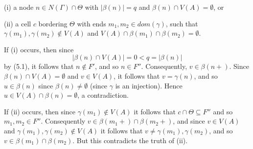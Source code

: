 \hspace*{12pt}(i) a node $n \in N(\Gamma) \cap \Theta$ with $|\beta(n)| = q$ and $\beta(n) \cap V(A) = \emptyset$, or

\hspace*{12pt}(ii) a cell $c$ bordering $\Theta$ with ends $m_1, m_2 \in dom(\gamma)$, such that $\gamma(m_1), \gamma(m_2) \notin V(A)$ and $V(A) \cap \beta(m_1) \cap \beta(m_2) = \emptyset$.

If (i) occurs, then since
\begin{equation*}
|\beta(n) \cap V(A)| = 0 < q = |\beta(n)|
\end{equation*}
by (5.1), it follows that $n \notin F'$, and so $n \in F''$. Consequently, $v \in \beta(n+)$. Since $\beta(n) \cap V(A) = \emptyset$ and $v \in V(A)$, it follows that $v = \gamma(n)$, and so $u \in \beta(n)$ since $\beta(n) \ne \emptyset$ (since $\gamma$ is an injection). Hence $u \in V(A) \cap \beta(n) = \emptyset$, a contradiction.

If (ii) occurs, then since $\gamma(m_1) \notin V(A)$ it follows that $c \cap \Theta \subseteq F''$ and so $m_1, m_2 \in F''$. Consequently $v \in \beta(m_1 +) \cap \beta(m_2 +)$, and since $v \in V(A)$ and $\gamma(m_1), \gamma(m_2) \notin V(A)$ it follows that $v \ne \gamma(m_1), \gamma(m_2)$, and so $v \in \beta(m_1) \cap \beta(m_2)$. But this contradicts the truth of (ii).
